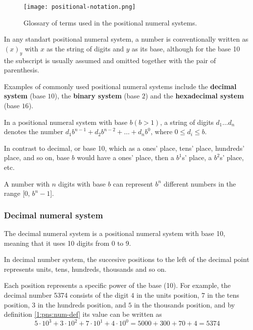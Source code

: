 \begin{figure}[htbp]
    \centerline{\texttt{[image: positional-notation.png]}}
    \caption{Glossary of terms used in the positional numeral systems.}
\end{figure}

In any standart positional numeral system, a number is conventionally written as $\left( x \right)_{y} $ with $x$ as the string of digits and $y$ as its base, although for the base 10 the subscript is usually assumed and omitted together with the pair of parenthesis.

Examples of commonly used positional numeral systems include the \textbf{decimal system} (base $10$), the \textbf{binary system} (base $2$) and the \textbf{hexadecimal system} (base $16$).

\begin{definition}
\label{1:pns:num-def}
In a positional numeral system with base $b \left( b > 1 \right) $, a string of digits $d_1\ldots d_n$ denotes the number $d_1b^{n-1} + d_2b^{n-2} + \ldots + d_nb^{0}$, where $0 \le d_i \le b$. 
\end{definition}

In contrast to decimal, or base 10, which as a ones' place, tens' place, hundreds' place, and so on, base $b$ would have a ones' place, then a $b^1$s' place, a $b^2$s' place, etc. 

\begin{proposition}
    A number with $n$ digits with base $b$ can represent $b^n$ different numbers in the range [$0$, $b^n - 1$].
\end{proposition}

\subsubsection{Decimal numeral system}
\begin{definition}
    The decimal numeral system is a positional numeral system with base 10, meaning that it uses 10 digits from 0 to 9.
\end{definition}

In decimal number system, the succesive positions to the left of the decimal point represents units, tens, hundreds, thousands and so on. 

Each position represents a specific power of the base (10). For example, the decimal number 5374 consists of the digit $4$ in the units position, $7$ in the tens position, $3$ in the hundreds position, and $5$ in the thousands position, and by definition \ref{1:pns:num-def} its value can be written as
\begin{equation}
    5\cdot 10^3 + 3\cdot 10^2 + 7\cdot 10^1 + 4\cdot 10^0 = 5000 + 300 + 70 + 4 = 5374
\end{equation}

